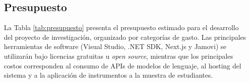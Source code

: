 \begin{landscape}
\begin{table}[htbp]
\end{table}
\end{landscape}


\subsection{Presupuesto}

La Tabla \ref{tab:presupuesto} presenta el presupuesto estimado para
el desarrollo del proyecto de investigación, organizado por categorías
de gasto. Las principales herramientas de software (Visual Studio,
.NET SDK, Next.js y Jamovi) se utilizarán bajo licencias gratuitas u
\textit{open source}, mientras que los principales costos corresponden
al consumo de APIs de modelos de lenguaje, al hosting del sistema y a
la aplicación de instrumentos a la muestra de estudiantes.

